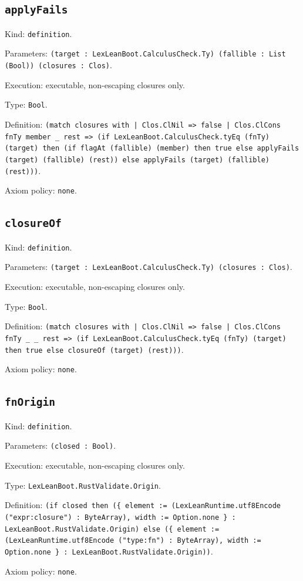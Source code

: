 \documentclass[11pt]{article}
\begin{document}
\subsection*{\texttt{applyFails}}
\noindent Kind: \texttt{definition}.\par
\noindent Parameters: \texttt{(target : LexLeanBoot.CalculusCheck.Ty) (fallible : List (Bool)) (closures : Clos)}.\par
\noindent Execution: executable, non-escaping closures only.\par
\noindent Type: \texttt{Bool}.\par
\noindent Definition: \texttt{(match closures with | Clos.ClNil => false | Clos.ClCons fnTy member \_ rest => (if LexLeanBoot.CalculusCheck.tyEq (fnTy) (target) then (if flagAt (fallible) (member) then true else applyFails (target) (fallible) (rest)) else applyFails (target) (fallible) (rest)))}.\par
\noindent Axiom policy: \texttt{none}.\par
\subsection*{\texttt{closureOf}}
\noindent Kind: \texttt{definition}.\par
\noindent Parameters: \texttt{(target : LexLeanBoot.CalculusCheck.Ty) (closures : Clos)}.\par
\noindent Execution: executable, non-escaping closures only.\par
\noindent Type: \texttt{Bool}.\par
\noindent Definition: \texttt{(match closures with | Clos.ClNil => false | Clos.ClCons fnTy \_ \_ rest => (if LexLeanBoot.CalculusCheck.tyEq (fnTy) (target) then true else closureOf (target) (rest)))}.\par
\noindent Axiom policy: \texttt{none}.\par
\subsection*{\texttt{fnOrigin}}
\noindent Kind: \texttt{definition}.\par
\noindent Parameters: \texttt{(closed : Bool)}.\par
\noindent Execution: executable, non-escaping closures only.\par
\noindent Type: \texttt{LexLeanBoot.RustValidate.Origin}.\par
\noindent Definition: \texttt{(if closed then (\{ element := (LexLeanRuntime.utf8Encode ("expr:closure") : ByteArray), width := Option.none \} : LexLeanBoot.RustValidate.Origin) else (\{ element := (LexLeanRuntime.utf8Encode ("type:fn") : ByteArray), width := Option.none \} : LexLeanBoot.RustValidate.Origin))}.\par
\noindent Axiom policy: \texttt{none}.\par
\end{document}
